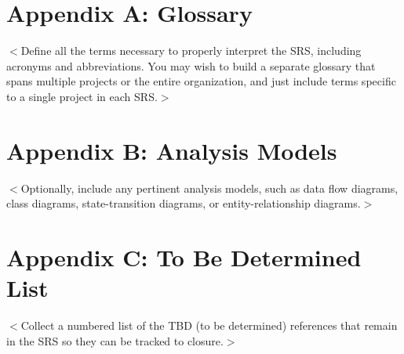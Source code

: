 \documentclass{scrreprt}
\begin{document}
\begin{CJK}{UTF8}{bkai}
\section{Appendix A: Glossary}
$<$Define all the terms necessary to properly interpret the SRS, including 
acronyms and abbreviations. You may wish to build a separate glossary that spans 
multiple projects or the entire organization, and just include terms specific to 
a single project in each SRS.$>$

\section{Appendix B: Analysis Models}
$<$Optionally, include any pertinent analysis models, such as data flow 
diagrams, class diagrams, state-transition diagrams, or entity-relationship 
diagrams.$>$

\section{Appendix C: To Be Determined List}
$<$Collect a numbered list of the TBD (to be determined) references that remain 
in the SRS so they can be tracked to closure.$>$
\end{CJK}
\end{document}

